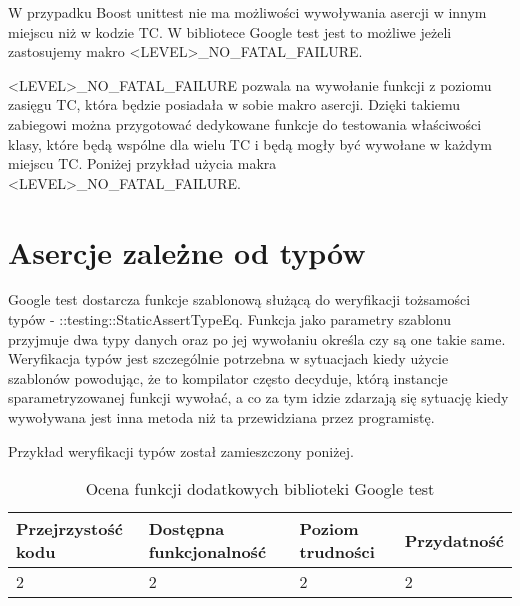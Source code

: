 \documentclass[12pt,a4paper,notitlepage]{report}
\begin{document}
W przypadku Boost unittest nie ma możliwości wywoływania asercji w innym miejscu niż w kodzie TC. W bibliotece Google test jest to możliwe jeżeli zastosujemy makro <LEVEL>{\_}NO{\_}FATAL{\_}FAILURE.

<LEVEL>{\_}NO{\_}FATAL{\_}FAILURE pozwala na wywołanie funkcji z poziomu zasięgu TC, która będzie posiadała w sobie makro asercji. Dzięki takiemu zabiegowi można przygotować dedykowane funkcje do testowania właściwości klasy, które będą wspólne dla wielu TC i będą mogły być wywołane w każdym miejscu TC. Poniżej przykład użycia makra <LEVEL>{\_}NO{\_}FATAL{\_}FAILURE.

			

\section{Asercje zależne od typów}

Google test dostarcza funkcje szablonową służącą do weryfikacji tożsamości typów - ::testing::StaticAssertTypeEq. Funkcja jako parametry szablonu przyjmuje dwa typy danych oraz po jej wywołaniu określa czy są one takie same.
Weryfikacja typów jest szczególnie potrzebna w sytuacjach kiedy użycie szablonów powodując, że to kompilator często decyduje, którą instancje sparametryzowanej funkcji wywołać, a co za tym idzie zdarzają się sytuację kiedy wywoływana jest inna metoda niż ta przewidziana przez programistę.

Przykład weryfikacji typów został zamieszczony poniżej.

			


\begin{center}
			\begin{table}[!ht]
			\caption{Ocena funkcji dodatkowych biblioteki Google test}
			\label{}
			\begin{tabular}[!hc]{|l|l|l|l|}
		\hline
		Przejrzystość kodu 	&	Dostępna funkcjonalność	&	Poziom trudności	&	Przydatność \\ \hline
		2					&	2						&	2					& 	2  			\\ \hline
			\end{tabular}
			\end{table} 
		\end{center}
\end{document}

